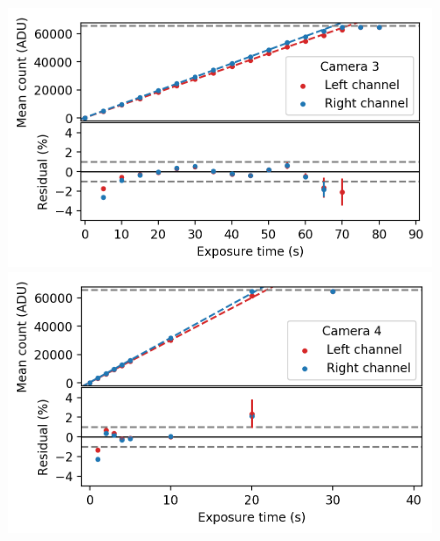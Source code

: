 \begin{colsection}
\begin{colsection}
\begin{figure}[p]
\begin{center}
        \begin{minipage}[t]{0.49\textwidth}\vspace{10pt}
            \includegraphics[width=\linewidth]{images/detectors/lin_3.png}
        \end{minipage}
        \begin{minipage}[t]{0.49\textwidth}\vspace{10pt}
            \includegraphics[width=\linewidth]{images/detectors/lin_4.png}
        \end{minipage}


\end{center}
\end{figure}
\end{colsection}
\end{colsection}
